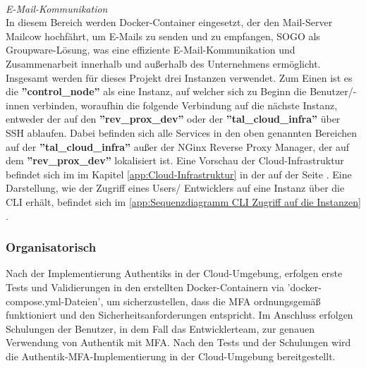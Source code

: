 \\\textit{E-Mail-Kommunikation}
\\In diesem Bereich werden Docker-Container eingesetzt, der den Mail-Server Mailcow hochfährt, um E-Mails zu senden und 
zu empfangen, SOGO als Groupware-Lösung, was eine effiziente E-Mail-Kommunikation und Zusammenarbeit innerhalb und außerhalb des 
Unternehmens ermöglicht.
Insgesamt werden für dieses Projekt drei Instanzen verwendet. Zum Einen ist es die \textbf{''control\_node''} 
als eine Instanz, auf welcher sich zu Beginn die Benutzer/-innen verbinden, woraufhin die folgende Verbindung auf die nächste Instanz, 
entweder der auf den \textbf{''rev\_prox\_dev''} oder der \textbf{''tal\_cloud\_infra''} über SSH ablaufen. Dabei befinden 
sich alle Services in den oben genannten Bereichen auf der \textbf{''tal\_cloud\_infra''} außer 
der NGinx Reverse Proxy Manager, der auf dem \textbf{''rev\_prox\_dev''} lokalisiert ist. Eine Vorschau der Cloud-Infrastruktur befindet 
sich im  im Kapitel \ref{app:Cloud-Infrastruktur} in der  auf der Seite 
\pageref{app:Cloud-Infrastruktur}. Eine Darstellung, wie der Zugriff eines Users/ Entwicklers auf eine Instanz über die CLI erhält, 
befindet sich im  \ref*{app:Sequenzdiagramm CLI Zugriff auf die Instanzen} .

\subsubsection{Organisatorisch}
\label{sec:Organisatorisch}
Nach der Implementierung Authentiks in der Cloud-Umgebung, erfolgen erste Tests und Validierungen in den erstellten 
Docker-Containern via 'docker-compose.yml-Dateien', um sicherzustellen, dass die \acs*{MFA} ordnungsgemäß funktioniert und den 
Sicherheitsanforderungen entspricht. 
Im Anschluss erfolgen Schulungen der Benutzer, in dem Fall das Entwicklerteam, zur genauen Verwendung von Authentik mit MFA. 
Nach den Tests und der Schulungen wird die Authentik-\acs*{MFA}-Implementierung in der Cloud-Umgebung bereitgestellt.

